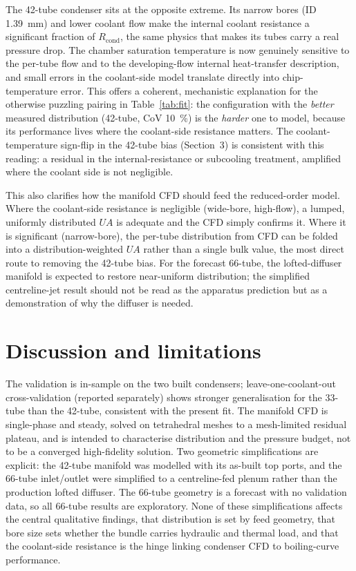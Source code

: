 \documentclass[11pt]{article}
\begin{document}
The 42-tube condenser sits at the opposite extreme. Its narrow bores (ID
\SI{1.39}{\milli\meter}) and lower coolant flow make the internal coolant resistance a
significant fraction of $R_{\mathrm{cond}}$, the same physics that makes its tubes carry a real
pressure drop. The chamber saturation temperature is now genuinely sensitive to the per-tube
flow and to the developing-flow internal heat-transfer description, and small errors in the
coolant-side model translate directly into chip-temperature error. This offers a coherent,
mechanistic explanation for the otherwise puzzling pairing in
Table~\ref{tab:fit}: the configuration with the \emph{better} measured distribution (42-tube,
CoV \SI{10}{\percent}) is the \emph{harder} one to model, because its performance lives where
the coolant-side resistance matters. The coolant-temperature sign-flip in the 42-tube bias
(Section~3) is consistent with this reading: a residual in the internal-resistance or
subcooling treatment, amplified where the coolant side is not negligible.

This also clarifies how the manifold CFD should feed the reduced-order model. Where the
coolant-side resistance is negligible (wide-bore, high-flow), a lumped, uniformly distributed
$UA$ is adequate and the CFD simply confirms it. Where it is significant (narrow-bore), the
per-tube distribution from CFD can be folded into a distribution-weighted $UA$ rather than a
single bulk value, the most direct route to removing the 42-tube bias. For the forecast
66-tube, the lofted-diffuser manifold is expected to restore near-uniform distribution; the
simplified centreline-jet result should not be read as the apparatus prediction but as a
demonstration of why the diffuser is needed.

\section{Discussion and limitations}
\label{sec:limits}
The validation is in-sample on the two built condensers; leave-one-coolant-out
cross-validation (reported separately) shows stronger generalisation for the 33-tube than the
42-tube, consistent with the present fit. The manifold CFD is single-phase and steady, solved
on tetrahedral meshes to a mesh-limited residual plateau, and is intended to characterise
distribution and the pressure budget, not to be a converged high-fidelity solution. Two
geometric simplifications are explicit: the 42-tube manifold was modelled with its as-built
top ports, and the 66-tube inlet/outlet were simplified to a centreline-fed plenum rather than
the production lofted diffuser. The 66-tube geometry is a forecast with no validation data, so
all 66-tube results are exploratory. None of these simplifications affects the central
qualitative findings, that distribution is set by feed geometry, that bore size sets whether
the bundle carries hydraulic and thermal load, and that the coolant-side resistance is the
hinge linking condenser CFD to boiling-curve performance.
\end{document}
